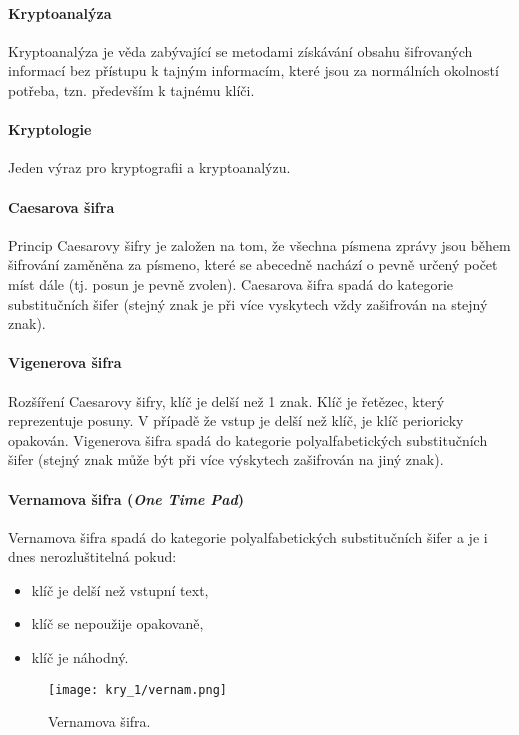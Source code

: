\paragraph*{Kryptoanalýza} Kryptoanalýza je věda zabývající se metodami získávání obsahu šifrovaných informací bez přístupu k tajným informacím, které jsou za normálních okolností potřeba, tzn. především k tajnému klíči.

\paragraph*{Kryptologie} Jeden výraz pro kryptografii a kryptoanalýzu.

\paragraph*{Caesarova šifra} Princip Caesarovy šifry je založen na tom, že všechna písmena zprávy jsou během šifrování zaměněna za písmeno, které se abecedně nachází o pevně určený počet míst dále (tj. posun je pevně zvolen). Caesarova šifra spadá do kategorie substitučních šifer (stejný znak je při více vyskytech vždy zašifrován na stejný znak).

\paragraph*{Vigenerova šifra} Rozšíření Caesarovy šifry, klíč je delší než 1 znak. Klíč je řetězec, který reprezentuje posuny. V případě že vstup je delší než klíč, je klíč perioricky opakován. Vigenerova šifra spadá do kategorie polyalfabetických substitučních šifer (stejný znak může být při více výskytech zašifrován na jiný znak).

\paragraph*{Vernamova šifra (\textit{One Time Pad})} Vernamova šifra spadá do kategorie polyalfabetických substitučních šifer a je i dnes nerozluštitelná pokud: \begin{itemize}
    \item klíč je delší než vstupní text,
    \item klíč se nepoužije opakovaně,
    \item klíč je náhodný.
\end{itemize}

\begin{figure}[H]
    \centering
    \texttt{[image: kry\_1/vernam.png]}
    \caption{Vernamova šifra.}
\end{figure}

